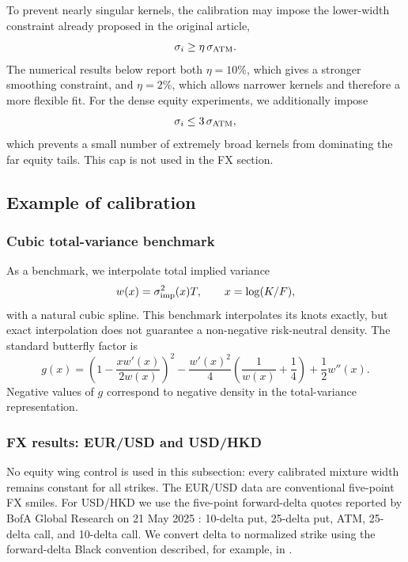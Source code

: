 \documentclass[11pt]{article}
\begin{document}
To prevent nearly singular kernels, the calibration may impose the lower-width constraint already proposed in the original article,
\begin{equation}
\sigma_i\ge\eta\,\sigma_{\rm ATM}.
\label{eq:floor}
\end{equation}
The numerical results below report both $\eta=10\%$, which gives a stronger smoothing constraint, and $\eta=2\%$, which allows narrower kernels and therefore a more flexible fit. For the dense equity experiments, we additionally impose
\begin{equation}
\sigma_i\le3\,\sigma_{\rm ATM},
\label{eq:cap}
\end{equation}
which prevents a small number of extremely broad kernels from dominating the far equity tails. This cap is not used in the FX section.

\subsection{Example of calibration}\label{sec:results}
\subsubsection*{Cubic total-variance benchmark}
As a benchmark, we interpolate total implied variance
\[
w(x)=\sigma_{\rm imp}^2(x)T,
\qquad x=\log(K/F),
\]
with a natural cubic spline. This benchmark interpolates its knots exactly, but exact interpolation does not guarantee a non-negative risk-neutral density. The standard butterfly factor is
\begin{equation}
g(x)=
\left(1-\frac{xw'(x)}{2w(x)}\right)^2
-\frac{w'(x)^2}{4}\left(\frac{1}{w(x)}+\frac14\right)
+\frac12w''(x).
\label{eq:g}
\end{equation}
Negative values of $g$ correspond to negative density in the total-variance representation.

\subsubsection*{FX results: EUR/USD and USD/HKD}\label{sec:fxresults}
No equity wing control is used in this subsection: every calibrated mixture width remains constant for all strikes. The EUR/USD data are conventional five-point FX smiles. For USD/HKD we use the five-point forward-delta quotes reported by BofA Global Research on 21 May 2025 \cite{bofa2025}: 10-delta put, 25-delta put, ATM, 25-delta call, and 10-delta call. We convert delta to normalized strike using the forward-delta Black convention described, for example, in \cite{clark}.
\end{document}
